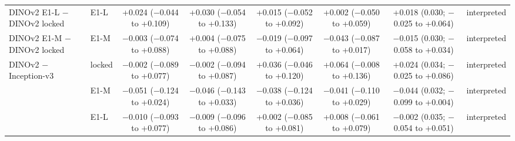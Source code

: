 \begin{longtable}{@{}p{3.6cm}lcccccp{2.6cm}@{}}
\addlinespace[2pt]
DINOv2 E1-L $-$ DINOv2 locked & E1-L & \makecell{+0.024\\{\scriptsize ($-$0.044 to +0.109)}} & \makecell{+0.030\\{\scriptsize ($-$0.054 to +0.133)}} & \makecell{+0.015\\{\scriptsize ($-$0.052 to +0.092)}} & \makecell{+0.002\\{\scriptsize ($-$0.050 to +0.059)}} & \makecell{+0.018\\{\scriptsize (0.030; $-$0.025 to +0.064)}} & interpreted \\
\addlinespace[2pt]
DINOv2 E1-M $-$ DINOv2 locked & E1-M & \makecell{$-$0.003\\{\scriptsize ($-$0.074 to +0.088)}} & \makecell{+0.004\\{\scriptsize ($-$0.075 to +0.088)}} & \makecell{$-$0.019\\{\scriptsize ($-$0.097 to +0.064)}} & \makecell{$-$0.043\\{\scriptsize ($-$0.087 to +0.017)}} & \makecell{$-$0.015\\{\scriptsize (0.030; $-$0.058 to +0.034)}} & interpreted \\
\addlinespace[2pt]
DINOv2 $-$ Inception-v3 & locked & \makecell{$-$0.002\\{\scriptsize ($-$0.089 to +0.077)}} & \makecell{$-$0.002\\{\scriptsize ($-$0.094 to +0.087)}} & \makecell{+0.036\\{\scriptsize ($-$0.046 to +0.120)}} & \makecell{+0.064\\{\scriptsize ($-$0.008 to +0.136)}} & \makecell{+0.024\\{\scriptsize (0.034; $-$0.025 to +0.086)}} & interpreted \\
 & E1-M & \makecell{$-$0.051\\{\scriptsize ($-$0.124 to +0.024)}} & \makecell{$-$0.046\\{\scriptsize ($-$0.143 to +0.033)}} & \makecell{$-$0.038\\{\scriptsize ($-$0.124 to +0.036)}} & \makecell{$-$0.041\\{\scriptsize ($-$0.110 to +0.029)}} & \makecell{$-$0.044\\{\scriptsize (0.032; $-$0.099 to +0.004)}} & interpreted \\
 & E1-L & \makecell{$-$0.010\\{\scriptsize ($-$0.093 to +0.077)}} & \makecell{$-$0.009\\{\scriptsize ($-$0.096 to +0.086)}} & \makecell{+0.002\\{\scriptsize ($-$0.085 to +0.081)}} & \makecell{+0.008\\{\scriptsize ($-$0.061 to +0.079)}} & \makecell{$-$0.002\\{\scriptsize (0.035; $-$0.054 to +0.051)}} & interpreted \\

\end{longtable}
